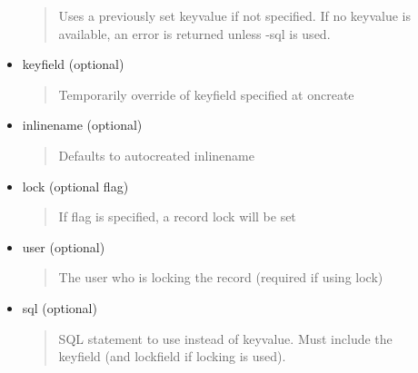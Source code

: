 \documentclass[letterpaper,10pt,english]{sphinxmanual}
\begin{document}
\begin{fulllineitems}
\begin{fulllineitems}
\begin{description}
\begin{itemize}
\begin{quote}
Uses a previously set keyvalue if not specified. If no keyvalue is available, an error is returned unless -sql is used.
\end{quote}

\item {} 
keyfield (optional)
\begin{quote}

Temporarily override of keyfield specified at oncreate
\end{quote}

\item {} 
inlinename (optional)
\begin{quote}

Defaults to autocreated inlinename
\end{quote}

\item {} 
lock (optional flag)
\begin{quote}

If flag is specified, a record lock will be set
\end{quote}

\item {} 
user (optional)
\begin{quote}

The user who is locking the record (required if using lock)
\end{quote}

\item {} 
sql (optional)
\begin{quote}

SQL statement to use instead of keyvalue. Must include the keyfield (and lockfield if locking is used).
\end{quote}

\end{itemize}

\end{description}

\end{fulllineitems}


\begin{fulllineitems}
\label{knop_database:knop_database.host}
\end{fulllineitems}



\begin{fulllineitems}
\end{fulllineitems}


\end{fulllineitems}
\end{document}
